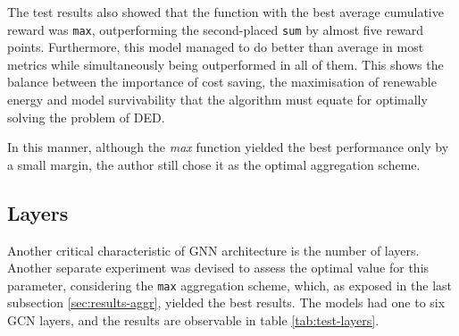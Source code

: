 The test results also showed that the function with the best average cumulative reward was \texttt{max}, outperforming the second-placed \texttt{sum} by almost five reward points. Furthermore, this model managed to do better than average in most metrics while simultaneously being outperformed in all of them. This shows the balance between the importance of cost saving, the maximisation of renewable energy and model survivability that the algorithm must equate for optimally solving the problem of \ac{DED}. \par
In this manner, although the \textit{max} function yielded the best performance only by a small margin, the author still chose it as the optimal aggregation scheme.

\subsection{Layers} \label{sec:results-layers}

Another critical characteristic of \ac{GNN} architecture is the number of layers. Another separate experiment was devised to assess the optimal value for this parameter, considering the \texttt{max} aggregation scheme, which, as exposed in the last subsection \ref{sec:results-aggr}, yielded the best results. The models had one to six \ac{GCN} layers, and the results are observable in table \ref{tab:test-layers}.

